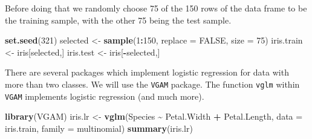 \documentclass[
]{krantz}
\makeatletter
\newenvironment{Shaded}{\begin{snugshade}}{\end{snugshade}}
\newcommand{\DataTypeTok}[1]{\textcolor[rgb]{0.27,0.27,0.27}{#1}}
\newcommand{\DecValTok}[1]{\textcolor[rgb]{0.06,0.06,0.06}{#1}}
\newcommand{\KeywordTok}[1]{\textcolor[rgb]{0.27,0.27,0.27}{\textbf{#1}}}
\newcommand{\NormalTok}[1]{#1}
\newcommand{\OperatorTok}[1]{\textcolor[rgb]{0.43,0.43,0.43}{\textbf{#1}}}
\newcommand{\OtherTok}[1]{\textcolor[rgb]{0.37,0.37,0.37}{#1}}
\newcommand{\StringTok}[1]{\textcolor[rgb]{0.5,0.5,0.5}{#1}}
\newenvironment{kframe}{%
\medskip{}
\setlength{\fboxsep}{.8em}
 \def\at@end@of@kframe{}%
 \ifinner\ifhmode%
  \def\at@end@of@kframe{\end{minipage}}%
  \begin{minipage}{\columnwidth}%
 \fi\fi%
 \def\FrameCommand##1{\hskip\@totalleftmargin \hskip-\fboxsep
 \colorbox{shadecolor}{##1}\hskip-\fboxsep
     \hskip-\linewidth \hskip-\@totalleftmargin \hskip\columnwidth}%
 \MakeFramed {\advance\hsize-\width
   \@totalleftmargin\z@ \linewidth\hsize
   \@setminipage}}%
 {\par\unskip\endMakeFramed%
 \at@end@of@kframe}
\renewenvironment{Shaded}{\begin{kframe}}{\end{kframe}}
\makeatother
\begin{document}
Before doing that we randomly choose 75 of the 150 rows of the data frame to be the training sample, with the other 75 being the test sample.

\begin{Shaded}
\begin{Highlighting}[]
\KeywordTok{set.seed}\NormalTok{(}\DecValTok{321}\NormalTok{)}
\NormalTok{selected \textless{}{-}}\StringTok{ }\KeywordTok{sample}\NormalTok{(}\DecValTok{1}\OperatorTok{:}\DecValTok{150}\NormalTok{, }\DataTypeTok{replace =} \OtherTok{FALSE}\NormalTok{, }\DataTypeTok{size =} \DecValTok{75}\NormalTok{)}
\NormalTok{iris.train \textless{}{-}}\StringTok{ }\NormalTok{iris[selected,]}
\NormalTok{iris.test \textless{}{-}}\StringTok{ }\NormalTok{iris[}\OperatorTok{{-}}\NormalTok{selected,]}
\end{Highlighting}
\end{Shaded}

There are several packages which implement logistic regression for data with more than two classes. We will use the \texttt{VGAM} package. The function \texttt{vglm} within \texttt{VGAM} implements logistic regression (and much more).

\begin{Shaded}
\begin{Highlighting}[]
\KeywordTok{library}\NormalTok{(VGAM)}
\NormalTok{iris.lr \textless{}{-}}\StringTok{ }\KeywordTok{vglm}\NormalTok{(Species }\OperatorTok{\textasciitilde{}}\StringTok{ }\NormalTok{Petal.Width }\OperatorTok{+}\StringTok{ }\NormalTok{Petal.Length, }
                \DataTypeTok{data =}\NormalTok{ iris.train, }\DataTypeTok{family =}\NormalTok{ multinomial)}
\KeywordTok{summary}\NormalTok{(iris.lr)}
\end{Highlighting}
\end{Shaded}
\end{document}
